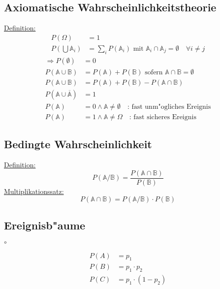 \subsection{Axiomatische Wahrscheinlichkeitstheorie}
\underline{Definition:}
\begin{align}
	P(\Omega) &= 1 \\
	P\left({\bigcup\mathbb{A}_i}\right) &= \sum_iP(\mathbb{A}_i)\text{ mit } \mathbb{A}_i\cap\mathbb{A}_j=\emptyset\quad\forall i\neq j
\end{align}
\begin{align*}
	\Longrightarrow P(\emptyset) &= 0 \\
	P(\mathbb{A}\cup\mathbb{B}) &= P(\mathbb{A})+P(\mathbb{B})\text{ sofern }\mathbb{A}\cap\mathbb{B}=\emptyset \\
	P(\mathbb{A}\cup\mathbb{B}) &= P(\mathbb{A})+P(\mathbb{B})-P(\mathbb{A}\cap\mathbb{B}) \\
	P(\mathbb{A}\cup\overline{\mathbb{A}}) &= 1 \\
	P(\mathbb{A}) &= 0\wedge\mathbb{A}\neq\emptyset\quad\text{: fast unm"ogliches Ereignis} \\
	P(\mathbb{A}) &= 1\wedge\mathbb{A}\neq\Omega\quad\text{: fast sicheres Ereignis}
\end{align*}

\subsection{Bedingte Wahrscheinlichkeit}
\underline{Definition:}
\begin{equation}
	P(\mathbb{A} / \mathbb{B}) = \frac{P(\mathbb{A}\cap\mathbb{B})}{P(\mathbb{B})}
\end{equation}
\underline{Multiplikationssatz:}
\begin{equation}
	P(\mathbb{A}\cap\mathbb{B}) = P(\mathbb{A}/\mathbb{B})\cdot P(\mathbb{B})
\end{equation}

\subsection{Ereignisb"aume}
\begin{center}
\setlength{\GapDepth}{1.0cm}
\setlength{\GapWidth}{1.0cm}
\begin{bundle}{$\circ$}
	\chunk[$1-p_1$]{
		\begin{bundle}{}
			\chunk{}
			\chunk{}
		\end{bundle}
	}
\end{bundle}
\end{center}
\begin{align*}
	P(A) &= p_1 \\
	P(B) &= p_1 \cdot p_2 \\
	P(C) &= p_1 \cdot (1-p_2)
\end{align*}

